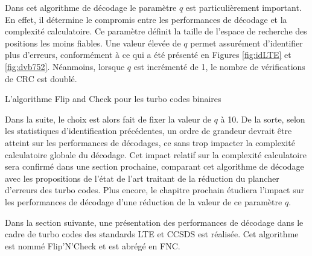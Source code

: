 Dans cet algorithme de décodage le paramètre $q$ est particulièrement important. En effet, il détermine le compromis entre les performances
de décodage et la complexité calculatoire. Ce paramètre définit la taille de l'espace de recherche des positions les moins
fiables. Une valeur élevée de $q$ permet assurément d'identifier plus d'erreurs, conformément à ce qui a été
présenté en Figures \ref{fig:idLTE} et \ref{fig:dvb752}. Néanmoins, lorsque $q$ est incrémenté de 1, le nombre de 
vérifications de CRC est doublé.
\begin{center}
\begin{minipage}{.86\textwidth}%
\begin{algorithm}[H]
\label{alg:fc_b}
	\DontPrintSemicolon
	
	\;
	\caption{L'algorithme Flip and Check pour les turbo codes binaires}
\end{algorithm}
\end{minipage}
\end{center}
Dans la suite, le choix est alors fait de fixer la valeur de $q$ à 10. De la sorte, selon les statistiques d'identification 
précédentes, un ordre de grandeur devrait être atteint sur les performances de décodages, ce sans trop impacter la complexité
calculatoire globale du décodage. Cet impact relatif sur la complexité calculatoire sera confirmé dans une section prochaine,
comparant cet algorithme de décodage avec les propositions de l'état de l'art traitant de la réduction du plancher d'erreurs des turbo codes.
Plus encore, le chapitre prochain étudiera l'impact sur les performances de décodage d'une réduction de la valeur de ce paramètre $q$.

Dans la section suivante, une présentation des performances de décodage dans le cadre de turbo codes des standards LTE
et CCSDS est réalisée. Cet algorithme est nommé Flip'N'Check et est abrégé en FNC.


